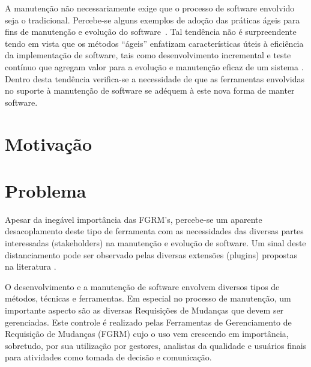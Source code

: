 A manutenção não necessariamente exige que o processo de software envolvido
seja o tradicional. Percebe-se alguns exemplos de adoção das práticas ágeis
para fins de manutenção e evolução do software~\cite{kajko2009model, Heeager2015, Devulapally2015,Naz2016}. Tal
tendência não é surpreendente tendo em vista que os métodos ``ágeis'' enfatizam
características úteis à eficiência da implementação de software, tais como desenvolvimento incremental e teste contínuo que agregam valor para a evolução e manutenção eficaz de um sistema
\cite{thomas2006agile}. Dentro desta tendência verifica-se a necessidade de que as ferramentas envolvidas no suporte à manutenção de software se adéquem à este nova forma de manter software. 

\section{Motivação}
\label{sec:intro-motivacao}


\section{Problema}
\label{sec:intro-problema}

Apesar da inegável importância das FGRM's, percebe-se um aparente desacoplamento deste tipo de
ferramenta com as necessidades das diversas partes interessadas (stakeholders) na manutenção e
evolução de software. Um sinal deste distanciamento pode ser observado pelas diversas extensões
(plugins) propostas na literatura
\cite{101186,Thung:2014:BIT:2635868.2661678,Kononenko:2014:DED:2591062.2591075}.
 
O desenvolvimento e a manutenção de software envolvem diversos tipos de métodos, técnicas e
ferramentas. Em especial no processo de manutenção, um importante aspecto são as diversas
Requisições de Mudanças que devem ser gerenciadas. Este controle é realizado pelas Ferramentas de
Gerenciamento de Requisição de Mudanças (FGRM) cujo o uso vem crescendo em importância, sobretudo,
por sua utilização por gestores, analistas da qualidade e usuários finais para atividades como
tomada de decisão e comunicação.

